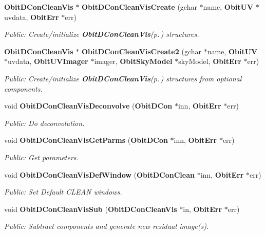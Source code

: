 \begin{CompactItemize}
{\bf Obit\-DCon\-Clean\-Vis} $\ast$ {\bf Obit\-DCon\-Clean\-Vis\-Create} (gchar $\ast$name, {\bf Obit\-UV} $\ast$uvdata, {\bf Obit\-Err} $\ast$err)
\begin{CompactList}\small\item\em Public: Create/initialize {\bf Obit\-DCon\-Clean\-Vis}{\rm (p.\,\pageref{structObitDConCleanVis})} structures. \item\end{CompactList}\item 
{\bf Obit\-DCon\-Clean\-Vis} $\ast$ {\bf Obit\-DCon\-Clean\-Vis\-Create2} (gchar $\ast$name, {\bf Obit\-UV} $\ast$uvdata, {\bf Obit\-UVImager} $\ast$imager, {\bf Obit\-Sky\-Model} $\ast$sky\-Model, {\bf Obit\-Err} $\ast$err)
\begin{CompactList}\small\item\em Public: Create/initialize {\bf Obit\-DCon\-Clean\-Vis}{\rm (p.\,\pageref{structObitDConCleanVis})} structures from optional components. \item\end{CompactList}\item 
void {\bf Obit\-DCon\-Clean\-Vis\-Deconvolve} ({\bf Obit\-DCon} $\ast$inn, {\bf Obit\-Err} $\ast$err)
\begin{CompactList}\small\item\em Public: Do deconvolution. \item\end{CompactList}\item 
void {\bf Obit\-DCon\-Clean\-Vis\-Get\-Parms} ({\bf Obit\-DCon} $\ast$inn, {\bf Obit\-Err} $\ast$err)
\begin{CompactList}\small\item\em Public: Get parameters. \item\end{CompactList}\item 
void {\bf Obit\-DCon\-Clean\-Vis\-Def\-Window} ({\bf Obit\-DCon\-Clean} $\ast$inn, {\bf Obit\-Err} $\ast$err)
\begin{CompactList}\small\item\em Public: Set Default CLEAN windows. \item\end{CompactList}\item 
void {\bf Obit\-DCon\-Clean\-Vis\-Sub} ({\bf Obit\-DCon\-Clean\-Vis} $\ast$in, {\bf Obit\-Err} $\ast$err)
\begin{CompactList}\small\item\em Public: Subtract components and generate new residual image(s). \item\end{CompactList}\item 

\end{CompactItemize}
